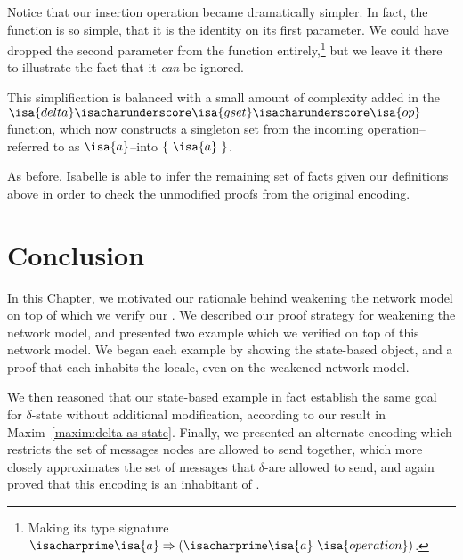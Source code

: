 Notice that our insertion operation became dramatically simpler. In fact, the
function is so simple, that it is the identity on its first
parameter. We could have dropped the second parameter from the function
entirely,\footnote{Making its type signature $\isacharprime\isa{a} \Rightarrow
(\isacharprime\isa{a}~\isa{operation})$.} but we leave it there to illustrate
the fact that it \emph{can} be ignored.

This simplification is balanced with a small amount of complexity added in the
$\isa{delta}\isacharunderscore\isa{gset}\isacharunderscore\isa{op}$ function,
which now constructs a singleton set from the incoming operation--referred
to as $\isa{a}$--into $\{~\isa{a}~\}$.

As before, Isabelle is able to infer the remaining set of facts given our
definitions above in order to check the unmodified proofs from the original
encoding.

\section{Conclusion}

In this Chapter, we motivated our rationale behind weakening the network model
on top of which we verify our \CRDTs. We described our proof strategy for
weakening the network model, and presented two example \CRDTs which we verified
on top of this network model. We began each example by showing the state-based
object, and a proof that each \CRDT inhabits the \SEC locale, even on the
weakened network model.

We then reasoned that our state-based example \CRDTs in fact establish the same
goal for $\delta$-state \CRDTs without additional modification, according to our
result in Maxim~\ref{maxim:delta-as-state}. Finally, we presented an alternate
encoding which restricts the set of messages nodes are allowed to send together,
which more closely approximates the set of messages that $\delta$-\CRDTs are
allowed to send, and again proved that this encoding is an inhabitant of \SEC.
